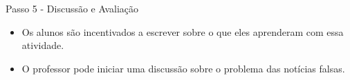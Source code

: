 \documentclass{beamer}
\begin{document}


\begin{frame}{Passo 5 - Discussão e Avaliação}

\begin{itemize}

\item<1-> Os alunos são incentivados a escrever sobre o que eles aprenderam com essa atividade.

\item<2-> O professor pode iniciar uma discussão sobre o problema das notícias falsas.


\end{itemize}


\end{frame}







\end{document}
